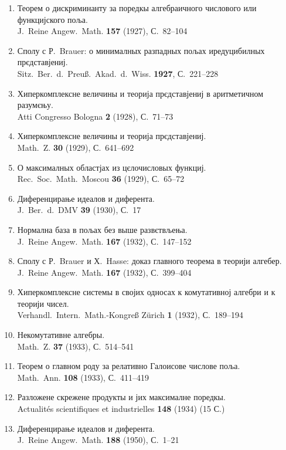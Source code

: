 \documentclass[11pt]{article}
\newcommand{\foreign}[1]{#1}
\begin{document}
\begin{enumerate}[label={\small\arabic*.},leftmargin=2em,itemsep=0.3em]
\item Теорем о дискриминанту за поредкы алгебраичного числового или функцијского поља.\\
\foreign{J.\ Reine Angew.\ Math.} \textbf{157} (1927), С.~82--104

\item Сполу с Р.\ Brauer: о минималных разпадных пољах иредуцибилных прєдставјениј.\\
\foreign{Sitz.\ Ber.\ d.\ Preuß.\ Akad.\ d.\ Wiss.} \textbf{1927}, С.~221--228

\item Хиперкомплексне величины и теорија прєдставјениј в аритметичном разумєњу.\\
\foreign{Atti Congresso Bologna} \textbf{2} (1928), С.~71--73

\item Хиперкомплексне величины и теорија прєдставјениј.\\
\foreign{Math.\ Z.} \textbf{30} (1929), С.~641--692

\item О максималных областјах из цєлочисловых функциј.\\
\foreign{Rec.\ Soc.\ Math.\ Moscou} \textbf{36} (1929), С.~65--72

\item Диференцирање идеалов и диферента.\\
\foreign{J.\ Ber.\ d.\ DMV} \textbf{39} (1930), С.~17

\item Нормална база в пољах без выше развєтвљења.\\
\foreign{J.\ Reine Angew.\ Math.} \textbf{167} (1932), С.~147--152

\item Сполу с Р.\ Brauer и Х.\ Hasse: доказ главного теорема в теорији алгебер.\\
\foreign{J.\ Reine Angew.\ Math.} \textbf{167} (1932), С.~399--404

\item Хиперкомплексне системы в својих односах к комутативној алгебри и к теорији чисел.\\
\foreign{Verhandl.\ Intern.\ Math.-Kongreß Zürich} \textbf{1} (1932), С.~189--194

\item Некомутативне алгебры.\\
\foreign{Math.\ Z.} \textbf{37} (1933), С.~514--541

\item Теорем о главном роду за релативно Галоисове числове поља.\\
\foreign{Math.\ Ann.} \textbf{108} (1933), С.~411--419

\item Разложене скрежене продукты и јих максималне поредкы.\\
\foreign{Actualités scientifiques et industrielles} \textbf{148} (1934) (15 С.)

\item Диференцирање идеалов и диферента.\\
\foreign{J.\ Reine Angew.\ Math.} \textbf{188} (1950), С.~1--21
\end{enumerate}
\end{document}
